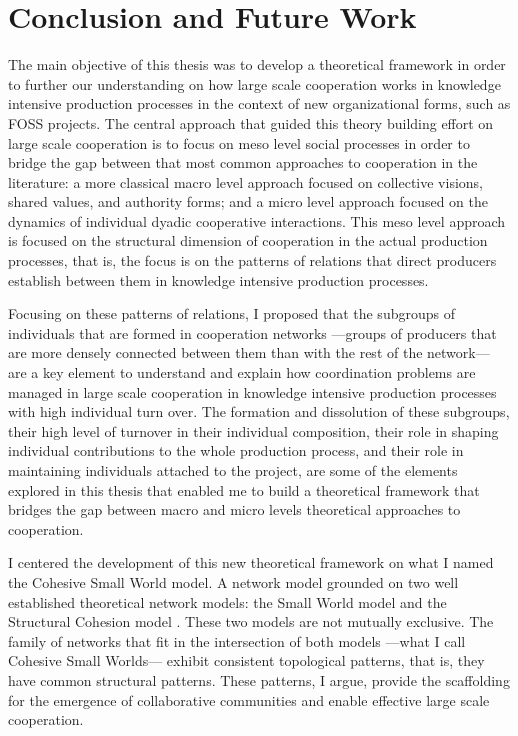 \chapter{Conclusion and Future Work}
\label{conclusion}

The main objective of this thesis was to develop a theoretical framework in order to further our understanding on how large scale cooperation works in knowledge intensive production processes in the context of new organizational forms, such as FOSS projects. The central approach that guided this theory building effort on large scale cooperation is to focus on meso level social processes in order to bridge the gap between that most common approaches to cooperation in the literature: a more classical macro level approach focused on collective visions, shared values, and authority forms; and a micro level approach focused on the dynamics of individual dyadic cooperative interactions. This meso level approach is focused on the structural dimension of cooperation in the actual production processes, that is, the focus is on the patterns of relations that direct producers establish between them in knowledge intensive production processes.

Focusing on these patterns of relations, I proposed that the subgroups of individuals that are formed in cooperation networks ---groups of producers that are more densely connected between them than with the rest of the network--- are a key element to understand and explain how coordination problems are managed in large scale cooperation in knowledge intensive production processes with high individual turn over. The formation and dissolution of these subgroups, their high level of turnover in their individual composition, their role in shaping individual contributions to the whole production process, and their role in maintaining individuals attached to the project, are some of the elements explored in this thesis that enabled me to build a theoretical framework that bridges the gap between macro and micro levels theoretical approaches to cooperation.

I centered the development of this new theoretical framework on what I named the Cohesive Small World model. A network model grounded on two well established theoretical network models: the Small World model \citep{watts:1998} and the Structural Cohesion model \citep{white:2001, moody:2003}. These two models are not mutually exclusive. The family of networks that fit in the intersection of both models ---what I call Cohesive Small Worlds--- exhibit consistent topological patterns, that is, they have common structural patterns. These patterns, I argue, provide the scaffolding for the emergence of collaborative communities \citep{adler:2006} and enable effective large scale cooperation.


